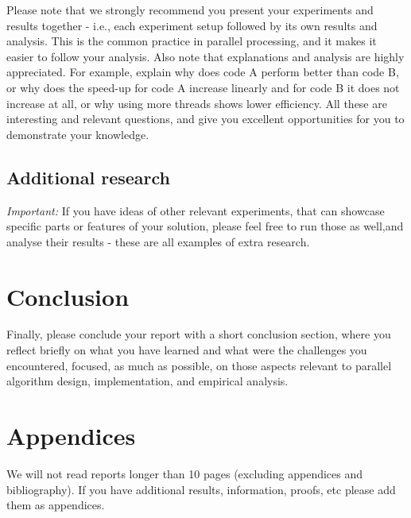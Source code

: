 \documentclass[a4paper,UKenglish,cleveref, autoref, thm-restate]{lipics-v2019}
\begin{document}
	Please note that we strongly recommend you present your experiments and results together - i.e., each experiment setup followed by its own results and analysis. This is the common practice in parallel processing, and it makes it easier to follow your analysis. Also note that explanations and analysis are highly appreciated. For example, explain why does code A perform better than code B, or why does the speed-up for code A increase linearly and for code B it does not increase at all, or why using more threads shows lower efficiency. All these are interesting and relevant questions, and give you excellent opportunities for you to demonstrate your knowledge.

	\subsection{Additional research}
		\textit{Important:} If you have ideas of other relevant experiments, that can showcase specific parts or features of your solution, please feel free to run those as well,and analyse their results - these are all examples of extra research.

	\section{Conclusion}
		Finally, please conclude your report with a short conclusion section, where you reflect briefly on what you have learned and what were the challenges you encountered, focused, as much as possible, on those aspects relevant to parallel algorithm design, implementation, and empirical analysis.  

	\section*{Appendices}
		We will not read reports longer than 10 pages (excluding appendices and bibliography). If you have additional results, information, proofs, etc please add them as appendices.
	
	{\small
	
	
	}
	
\end{document}
